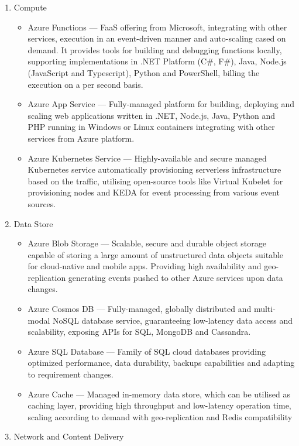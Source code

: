 \begin{enumerate}
   \item Compute
   \begin{itemize}
       \item Azure Functions --- FaaS offering from Microsoft, integrating with other services, execution in an event-driven manner and auto-scaling cased on demand. It provides tools for building and debugging functions locally, supporting implementations in .NET Platform (C\#, F\#), Java, Node.js (JavaScript and Typescript), Python and PowerShell, billing the execution on a per second basis.
       \item Azure App Service --- Fully-managed platform for building, deploying and scaling web applications written in .NET, Node.js, Java, Python and PHP running in Windows or Linux containers integrating with other services from Azure platform.
       \item Azure Kubernetes Service --- Highly-available and secure managed Kubernetes service automatically provisioning serverless infrastructure based on the traffic, utilising open-source tools like Virtual Kubelet for provisioning nodes and KEDA for event processing from various event sources.
   \end{itemize}
   \item Data Store
   \begin{itemize}
       \item Azure Blob Storage --- Scalable, secure and durable object storage capable of storing a large amount of unstructured data objects suitable for cloud-native and mobile apps. Providing high availability and geo-replication generating events pushed to other Azure services upon data changes.
       \item Azure Cosmos DB --- Fully-managed, globally distributed and multi-modal NoSQL database service, guaranteeing low-latency data access and scalability, exposing APIs for SQL, MongoDB and Cassandra.
       \item Azure SQL Database --- Family of SQL cloud databases providing optimized performance, data durability, backups capabilities and adapting to requirement changes.
       \item Azure Cache --- Managed in-memory data store, which can be utilised as caching layer, providing high throughput and low-latency operation time, scaling according to demand with geo-replication and Redis compatibility
   \end{itemize}
   \item Network and Content Delivery

\end{enumerate}
